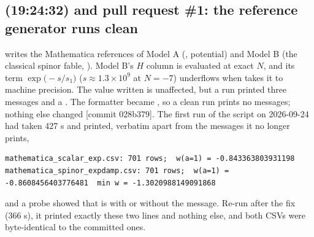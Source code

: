 \subsection{\texorpdfstring{}{028b379} (19:24:32) and pull request \#1: the reference generator runs clean}
\label{sec:2.2}

 writes the Mathematica  references of Model A (,  potential) and Model B (the classical spinor fable, ). Model B's $H$ column is evaluated at exact $N$, and its term $\exp\bigl(-s/s_1\bigr)$ ($s \approx 1.3\times10^{9}$ at $N = -7$) underflows when  takes it to machine precision. The value written is unaffected, but a run printed three  messages and a . The formatter became , so a clean run prints no messages; nothing else changed [commit 028b379]. The first run of the script on 2026-09-24 had taken 427 s and printed, verbatim apart from the messages it no longer prints,

\begin{Verbatim}
mathematica_scalar_exp.csv: 701 rows;  w(a=1) = -0.843363803931198
mathematica_spinor_expdamp.csv: 701 rows;  w(a=1) = -0.8608456403776481  min w = -1.3020988149091868
\end{Verbatim}

and a probe showed that  is  with or without the message. Re-run after the fix (366 s), it printed exactly these two lines and nothing else, and both CSVs were byte-identical to the committed ones.

